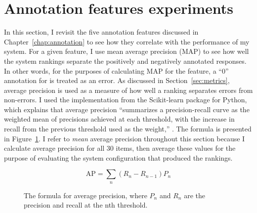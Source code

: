 \section{Annotation features experiments}
\label{sec:exp-annotations}
In this section, I revisit the five annotation features discussed in Chapter~\ref{chap:annotation} to see how they correlate with the performance of my system. For a given feature, I use mean average precision (MAP) to see how well the system rankings separate the positively and negatively annotated responses. In other words, for the purposes of  calculating MAP for the  feature, a ``0'' annotation for  is treated as an error. As discussed in Section~\ref{sec:metrics}, average precision is used as a measure of how well a ranking separates errors from non-errors. I used the  implementation from the Scikit-learn package for Python, which explains that average precision ``summarizes a precision-recall curve as the weighted mean of precisions achieved at each threshold, with the increase in recall from the previous threshold used as the weight,'' \cite{scikit-learn}. The formula is presented in Figure~\ref{fig:exp-ap}. I refer to \textit{mean} average precision throughout this section because I calculate average precision for all 30 items, then average these values for the purpose of evaluating the system configuration that produced the rankings.



\begin{figure}[htb!]
\begin{center}
\[
\text{AP} = {\sum_n (R_n - R_{n-1}) P_n}
\]
\caption{\label{fig:exp-ap} The formula for average precision, where $P_n$ and $R_n$ are the precision and recall at the nth threshold.}
\end{center}
\end{figure}




